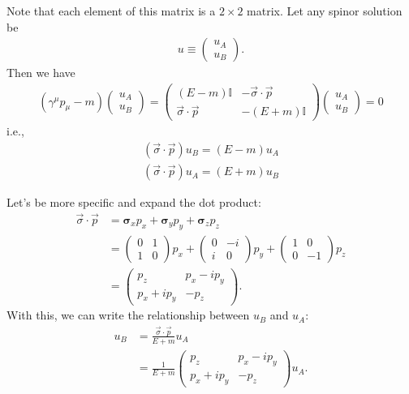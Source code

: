 \documentclass{book}
\theoremstyle{definition}
\newcommand{\nn}{\nonumber}
\newcommand{\f}[2]{\frac{#1}{#2}}
\begin{document}
Note that each element of this matrix is a $2\times 2$ matrix. Let any spinor solution be
\begin{align}
u \equiv \begin{pmatrix}
u_A \\ u_B
\end{pmatrix}.
\end{align}
Then we have
\begin{align}
\boxed{
(\gamma^\mu p_\mu - m)
\begin{pmatrix}
u_A \\ u_B
\end{pmatrix}
=
\begin{pmatrix}
(E-m)\mathbb{I} & -\vec{\sigma}\cdot\vec{p} \\ \vec{\sigma}\cdot\vec{p} & -(E+m)\mathbb{I}
\end{pmatrix}
\begin{pmatrix}
u_A \\ u_B
\end{pmatrix} = 0
}
\end{align}
i.e.,
\begin{align}
(\vec{\sigma}\cdot\vec{p})u_B = (E-m)u_A\\
(\vec{\sigma}\cdot\vec{p})u_A = (E+m)u_B
\end{align}

Let's be more specific and expand the dot product:
\begin{align}
\vec{\sigma}\cdot\vec{p} 
&= \mathbf{\sigma}_x p_x + \mathbf{\sigma}_y p_y + \mathbf{\sigma}_z p_z \nn\\
&= \begin{pmatrix}
0 & 1 \\ 1 & 0
\end{pmatrix}p_x 
+
\begin{pmatrix}
0 & -i \\ i & 0
\end{pmatrix}p_y
+ 
\begin{pmatrix}
1 & 0 \\ 0 & -1
\end{pmatrix}p_z \nn\\
&=
\begin{pmatrix}
p_z & p_x - ip_y\\ p_x + ip_y & -p_z
\end{pmatrix}.
\end{align}
With this, we can write the relationship between $u_B$ and $u_A$:
\begin{align}
u_B &= \f{\vec{\sigma}\cdot\vec{p}}{E+m} u_A \nn\\
&= \f{1}{E+m}\begin{pmatrix}
p_z & p_x - ip_y\\ p_x + ip_y & -p_z
\end{pmatrix}u_A.
\end{align}
\end{document}
